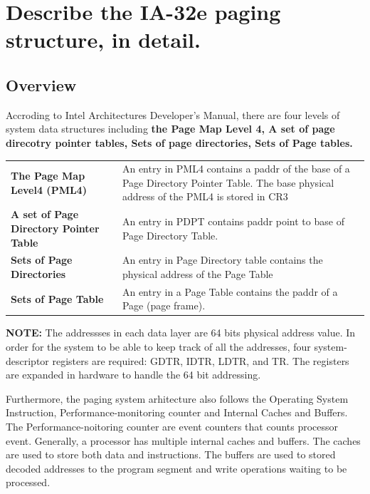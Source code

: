 \documentclass[letterpaper,10pt,titlepage,fleqn]{article}
\begin{document}
\newpage
\section*{Describe the IA-32e paging structure, in detail.}
\subsection*{Overview}
Accroding to Intel Architectures Developer's Manual, there are four levels of system data structures including 
\textbf{the Page Map Level 4, A set of page direcotry pointer tables, Sets of page directories, Sets of Page tables.}
\newline
\begin{tabular}{l p{8cm}}
   \textbf{The Page Map Level4 (PML4)} & An entry in PML4 contains a paddr of the base of a Page Directory Pointer Table. 
   The base physical address of the PML4 is stored in CR3\\
   \textbf{A set of Page Directory Pointer Table} & An entry in PDPT contains paddr point to base of Page Directory Table.\\
   \textbf{Sets of Page Directories} & An entry in Page Directory table contains the physical address of the Page Table\\
   \textbf{Sets of Page Table} & An entry in a Page Table contains the paddr of a Page (page frame). 
\end{tabular}
\newline
\newline
\textbf{NOTE: } The addressses in each data layer are 64 bits physical address value. In order for the system to be
able to keep track of all the addresses, four system-descriptor registers are required: GDTR, IDTR, LDTR, and TR.  
The registers are expanded in hardware to handle the 64 bit addressing.

Furthermore, the paging system arhitecture also follows the Operating System Instruction, Performance-monitoring counter
and Internal Caches and Buffers. The Performance-noitoring counter are event counters that counts processor event. 
Generally, a processor has multiple internal caches and buffers. The caches are used to store both data and instructions. 
The buffers are used to stored decoded addresses to the program segment and write operations waiting to be processed. 
\end{document}
